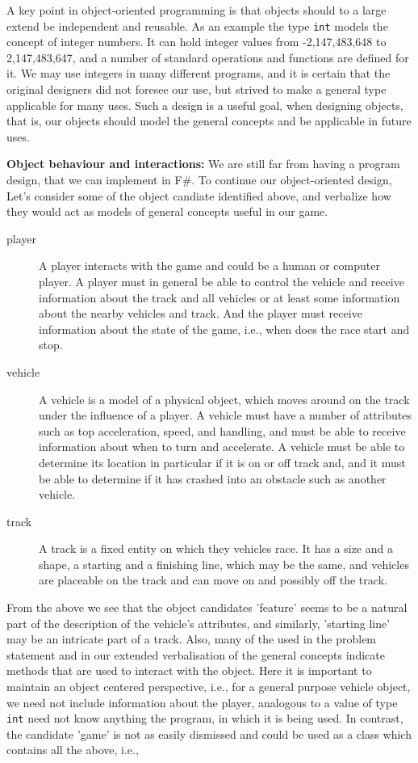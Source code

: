 \documentclass[fsharpnotes.tex]{subfiles}
\begin{document}
A key point in object-oriented programming is that objects should to a large extend be independent and reusable. As an example the type \lstinline|int| models the concept of integer numbers. It can hold integer values from -2,147,483,648 to 2,147,483,647, and a number of standard operations and functions are defined for it. We may use integers in many different programs, and it is certain that the original designers did not foresee our use, but strived to make a general type applicable for many uses. Such a design is a useful goal, when designing objects, that is, our objects should model the general concepts and be applicable in future uses.

\textbf{Object behaviour and interactions:} We are still far from having a program design, that we can implement in F\#. To continue our object-oriented design, Let's consider some of the object candiate identified above, and verbalize how they would act as models of general concepts useful in our game.
\begin{description}
\item[player] A player interacts with the game and could be a human or computer player. A player must in general be able to control the vehicle and receive information about the track and all vehicles or at least some information about the nearby vehicles and track. And the player must receive information about the state of the game, i.e., when does the race start and stop.
\item[vehicle] A vehicle is a model of a physical object, which moves around on the track under the influence of a player. A vehicle must have a number of attributes such as top acceleration, speed, and handling, and must be able to receive information about when to turn and accelerate. A vehicle must be able to determine its location in particular if it is on or off track and, and it must be able to determine if it has crashed into an obstacle such as another vehicle.
\item[track] A track is a fixed entity on which they vehicles race. It has a size and a shape, a starting and a finishing line, which may be the same, and vehicles are placeable on the track and can move on and possibly off the track.
\end{description}
From the above we see that the object candidates 'feature' seems to be a natural part of the description of the vehicle's attributes, and similarly, 'starting line' may be an intricate part of a track. Also, many of the  used in the problem statement and in our extended verbalisation of the general concepts indicate methods that are used to interact with the object. Here it is important to maintain an object centered perspective, i.e., for a general purpose vehicle object, we need not include information about the player, analogous to a value of type \lstinline|int| need not know anything the program, in which it is being used. In contrast, the candidate 'game' is not as easily dismissed and could be used as a class which contains all the above, i.e.,
\end{document}
